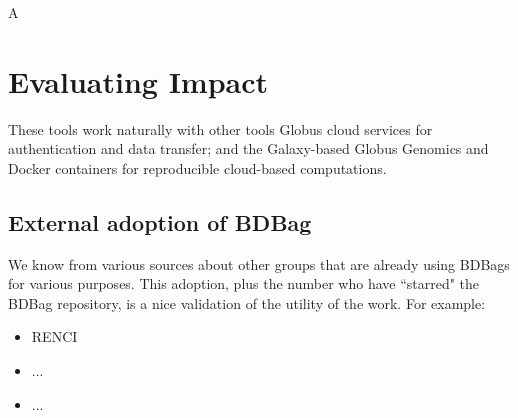 \documentclass[11pt]{article}
\begin{document}
A


\section{Evaluating Impact}

These tools work naturally with other tools
Globus cloud services for authentication and data transfer; 
and the Galaxy-based Globus Genomics and Docker containers for reproducible cloud-based computations. 


\subsection{External adoption of BDBag}

We know from various sources about other groups that are already using BDBags for various purposes.
This adoption, plus the number who have ``starred" the BDBag repository, is a nice validation of the
utility of the work. For example:
\begin{itemize}
\item
RENCI

\item
...

\item
...

\end{itemize}





\end{document}
